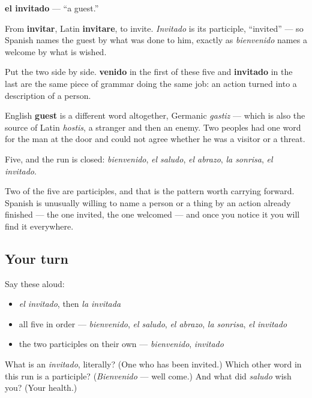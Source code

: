 \begin{cousinweb}
\textbf{el invitado} — \textquotedblleft{}a guest.\textquotedblright{}

From \textbf{invitar}, Latin \textbf{invitare}, to invite. \emph{Invitado} is its participle, \textquotedblleft{}invited\textquotedblright{} — so Spanish names the guest by what was done to him, exactly as \emph{bienvenido} names a welcome by what is wished.

Put the two side by side. \textbf{venido} in the first of these five and \textbf{invitado} in the last are the same piece of grammar doing the same job: an action turned into a description of a person.

English \textbf{guest} is a different word altogether, Germanic \emph{gastiz} — which is also the source of Latin \emph{hostis}, a stranger and then an enemy. Two peoples had one word for the man at the door and could not agree whether he was a visitor or a threat.
\end{cousinweb}

\begin{grammarlens}[title={What you've built}]
Five, and the run is closed: \emph{bienvenido}, \emph{el saludo}, \emph{el abrazo}, \emph{la sonrisa}, \emph{el invitado}.

Two of the five are participles, and that is the pattern worth carrying forward. Spanish is unusually willing to name a person or a thing by an action already finished — the one invited, the one welcomed — and once you notice it you will find it everywhere.
\end{grammarlens}

\subsection*{Your turn}
Say these aloud:

\begin{itemize}
\raggedright
  \item \emph{el invitado}, then \emph{la invitada}
  \item all five in order — \emph{bienvenido}, \emph{el saludo}, \emph{el abrazo}, \emph{la sonrisa}, \emph{el invitado}
  \item the two participles on their own — \emph{bienvenido}, \emph{invitado}
\end{itemize}

\begin{tcolorbox}[breakable,colback=teal!4,colframe=teal!35!black,title={Before you move on}]
What is an \emph{invitado}, literally? (One who has been invited.) Which other word in this run is a participle? (\emph{Bienvenido} — well come.) And what did \emph{saludo} wish you? (Your health.)
\end{tcolorbox}

